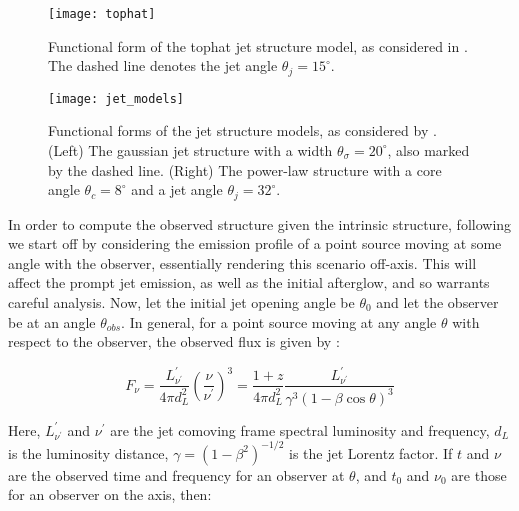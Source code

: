 \begin{itemize}
    \end{itemize}

    \begin{figure}[H]
        \centering
        \texttt{[image: tophat]}
        \caption[Tophat jet structure model]{
                    Functional form of the tophat jet structure model, as considered in
                    \cite{saleem_2020B}. The dashed line denotes the jet angle
                    $\theta_j = 15^{\circ}$.
             }
        \label{fig:tophat}
    \end{figure}

    \begin{figure}[H]
        \centering
        \texttt{[image: jet\_models]}
        \caption[Jet structures as in \cite{hayes_2020}]{
                    Functional forms of the jet structure models, as considered by
                    \cite{hayes_2020}. (Left) The gaussian jet structure with
                    a width $\theta_{\sigma} = 20^{\circ}$, also marked by the dashed
                    line. (Right) The power-law structure with a core angle $\theta_c =
                    8^\circ$ and a jet angle $\theta_j = 32^\circ$.
             }
        \label{fig:jet_models}
    \end{figure}

    In order to compute the observed structure given the intrinsic structure, following
    \cite{granot_2002} we start off by considering the emission profile of a
    point source moving at some angle with the observer, essentially rendering this
    scenario off-axis. This will affect the prompt jet emission, as well as the initial
    afterglow, and so warrants careful analysis.  Now, let the initial jet opening angle
    be $\theta_0$ and let the observer be at an angle $\theta_{obs}$. In general, for a
    point source moving at any angle $\theta$ with respect to the observer, the observed
    flux is given by :

    \begin{equation}
        \label{eq:1}
        F_{\nu} =
           \dfrac{L^{\prime}_{\nu^{\prime}}}{4 \pi d_L^2}
           \left( \dfrac{\nu}{\nu^\prime}\right)^3
                =
            \dfrac{1 + z}{4 \pi d_L^2}
            \dfrac{L^{\prime}_{\nu^{\prime}}}{\gamma^3 (1 - \beta \cos \theta)^3}
    \end{equation}

    Here, $L^{\prime}_{\nu^{\prime}}$ and $\nu^{\prime}$ are the jet comoving frame
    spectral luminosity and frequency, $d_L$ is the luminosity distance, $\gamma = (1 -
    \beta^2)^{-1/2}$ is the jet Lorentz factor. If $t$ and $\nu$ are the observed time
    and frequency  for an observer at $\theta$, and $t_0$ and $\nu_0$ are those for an
    observer on the axis, then:

